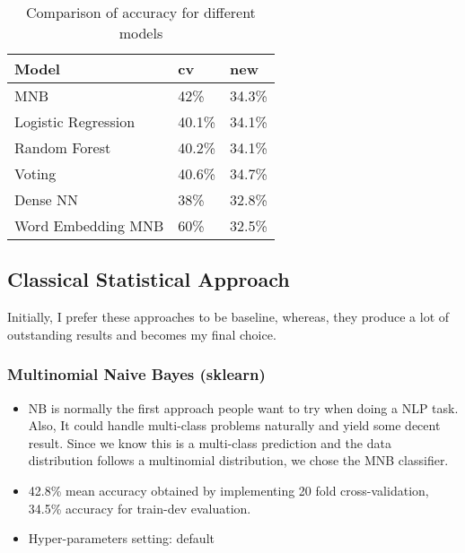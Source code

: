 \documentclass[11pt]{article}
\begin{document}
\begin{table}[h]
  \begin{center}
 \begin{tabular}{|l|l|l|}
 
       \hline
       Model & cv 
       & new\\
       \hline\hline
       MNB & 42\% & 34.3\% \\
       Logistic Regression & 40.1\% & 34.1\% \\
       Random Forest & 40.2\% & 34.1\% \\
       Voting & 40.6\% & 34.7\% \\
       Dense NN & 38\% & 32.8\% \\
       Word Embedding MNB & 60\% & 32.5\% \\
       \hline
 
 \end{tabular}
 \caption{Comparison of accuracy for different models}\label{accuracy}
  \end{center}
 \end{table}


\subsection{Classical Statistical Approach}

Initially, I prefer these approaches to be baseline, 
whereas, they produce a lot of outstanding results and becomes my 
final choice.
 
\subsubsection{Multinomial Naive Bayes (sklearn)}
\begin{itemize}
\item 
NB is normally the first approach people 
want to try when doing a NLP task. Also, It could handle multi-class
problems naturally and yield some decent result. Since we know this
is a multi-class prediction and the data distribution follows a multinomial
distribution, we chose the MNB classifier.

\item 
42.8\% mean accuracy obtained by implementing 20 fold cross-validation, 
34.5\% accuracy for train-dev evaluation.

\item 
Hyper-parameters setting: default
\end{itemize}
\end{document}
